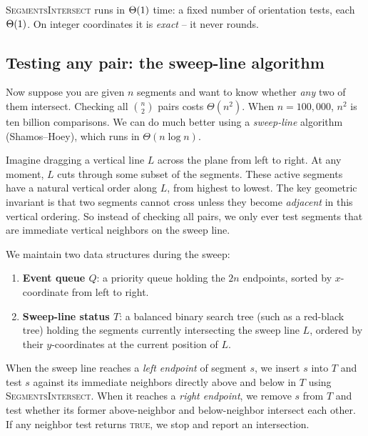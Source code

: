 \begin{complexitybox}
\textsc{SegmentsIntersect} runs in $\Theta(1)$ time: a fixed number of orientation
tests, each $\Theta(1)$. On integer coordinates it is \emph{exact} -- it never
rounds.
\end{complexitybox}

\subsection{Testing any pair: the sweep-line algorithm}
\label{ch32:sweepline}

Now suppose you are given $n$ segments and want to know whether \emph{any} two of
them intersect. Checking all $\binom{n}{2}$ pairs costs $\Theta(n^2)$.
When $n = 100{,}000$, $n^2$ is ten billion comparisons. We can do much better
using a \emph{sweep-line} algorithm (Shamos--Hoey), which runs in
$\Theta(n \log n)$.

\begin{intuitionbox}
Imagine dragging a vertical line $L$ across the plane from left to right.
At any moment, $L$ cuts through some subset of the segments. These active segments
have a natural vertical order along $L$, from highest to lowest. The key geometric
invariant is that two segments cannot cross unless they become \emph{adjacent} in this vertical
ordering. So instead of checking all pairs, we only ever test segments that are
immediate vertical neighbors on the sweep line.
\end{intuitionbox}

We maintain two data structures during the sweep:
\begin{enumerate}
  \item \textbf{Event queue $Q$}: a priority queue holding the $2n$ endpoints,
        sorted by $x$-coordinate from left to right.
  \item \textbf{Sweep-line status $T$}: a balanced binary search tree (such as a
        red-black tree) holding the segments currently intersecting the sweep line
        $L$, ordered by their $y$-coordinates at the current position of $L$.
\end{enumerate}

When the sweep line reaches a \emph{left endpoint} of segment $s$, we insert $s$
into $T$ and test $s$ against its immediate neighbors directly above and below in
$T$ using \textsc{SegmentsIntersect}. When it reaches a \emph{right endpoint}, we
remove $s$ from $T$ and test whether its former above-neighbor and below-neighbor
intersect each other. If any neighbor test returns \textsc{true}, we stop and
report an intersection.

